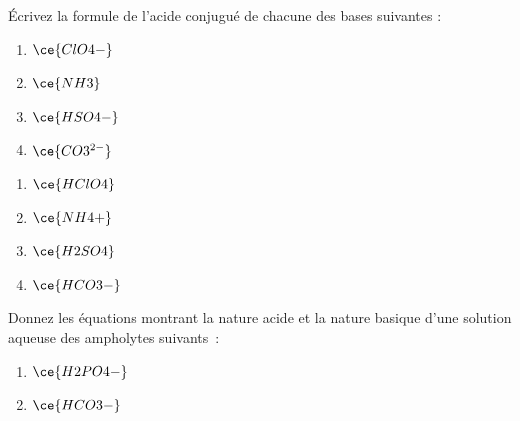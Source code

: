 \documentclass[
  11pt,
  a4paper,
  openany]{book}
\providecommand{\tightlist}{%
  \setlength{\itemsep}{0pt}\setlength{\parskip}{0pt}}
\begin{document}
\begin{Exercise}

Écrivez la formule de l'acide conjugué de chacune des bases suivantes :

\begin{enumerate}
\def\labelenumi{\alph{enumi}.}
\tightlist
\item
  \(\ce{ClO4-}\)
\item
  \(\ce{NH3}\)
\item
  \(\ce{HSO4-}\)
\item
  \(\ce{CO3^{2-}}\)
\end{enumerate}

\end{Exercise}

\begin{Answer}

\begin{enumerate}
\def\labelenumi{\alph{enumi}.}
\tightlist
\item
  \(\ce{HClO4}\)
\item
  \(\ce{NH4+}\)
\item
  \(\ce{H2SO4}\)
\item
  \(\ce{HCO3-}\)
\end{enumerate}

\end{Answer}

\begin{Exercise}

Donnez les équations montrant la nature acide et la nature basique d'une solution aqueuse des ampholytes suivants~:

\begin{enumerate}
\def\labelenumi{\alph{enumi}.}
\tightlist
\item
  \(\ce{H2PO4-}\)
\item
  \(\ce{HCO3-}\)
\end{enumerate}

\end{Exercise}
\end{document}

